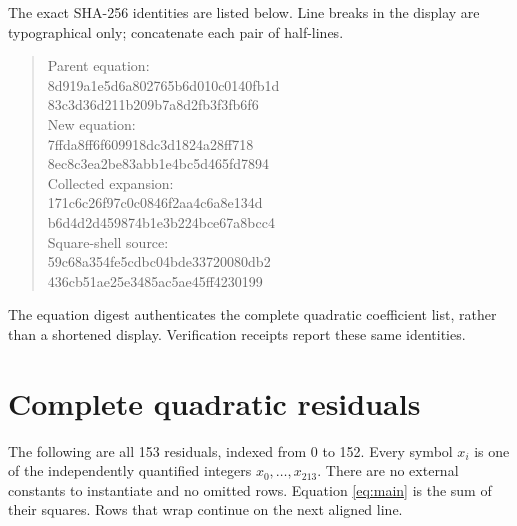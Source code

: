 \documentclass[11pt,a4paper]{article}
\theoremstyle{definition}
\begin{document}
The exact SHA-256 identities are listed below. Line breaks in the
display are typographical only; concatenate each pair of half-lines.
\begin{quote}\small\ttfamily
Parent equation:\\
8d919a1e5d6a802765b6d010c0140fb1d\\
83c3d36d211b209b7a8d2fb3f3fb6f6\\[4pt]
New equation:\\
7ffda8ff6f609918dc3d1824a28ff718\\
8ec8c3ea2be83abb1e4bc5d465fd7894\\[4pt]
Collected expansion:\\
171c6c26f97c0c0846f2aa4c6a8e134d\\
b6d4d2d459874b1e3b224bce67a8bcc4\\[4pt]
Square-shell source:\\
59c68a354fe5cdbc04bde33720080db2\\
436cb51ae25e3485ac5ae45ff4230199
\end{quote}
The equation digest authenticates the complete quadratic coefficient
list, rather than a shortened display. Verification receipts report
these same identities.

\clearpage
\section{Complete quadratic residuals}\label{app:residuals}

The following are all 153 residuals, indexed from 0 to 152. Every
symbol $x_i$ is one of the independently quantified integers
$x_0,\ldots,x_{213}$. There are no external constants to instantiate
and no omitted rows. Equation \eqref{eq:main} is the sum of their squares.
Rows that wrap continue on the next aligned line.


\end{document}
